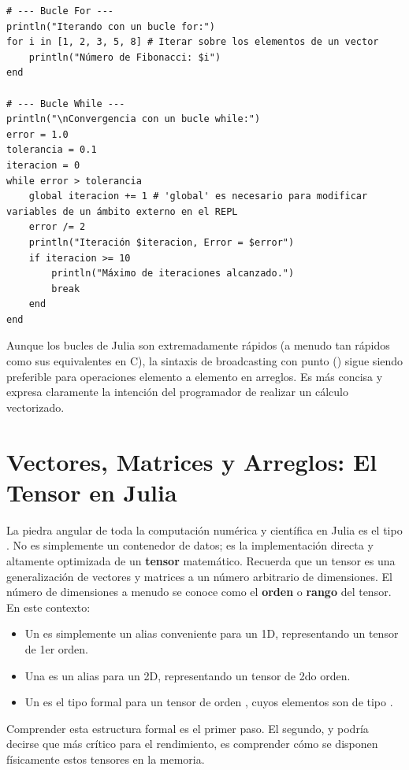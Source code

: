 \begin{example}
\text{ }\begin{verbatim}
# --- Bucle For ---
println("Iterando con un bucle for:")
for i in [1, 2, 3, 5, 8] # Iterar sobre los elementos de un vector
    println("Número de Fibonacci: $i")
end

# --- Bucle While ---
println("\nConvergencia con un bucle while:")
error = 1.0
tolerancia = 0.1
iteracion = 0
while error > tolerancia
    global iteracion += 1 # 'global' es necesario para modificar variables de un ámbito externo en el REPL
    error /= 2
    println("Iteración $iteracion, Error = $error")
    if iteracion >= 10
        println("Máximo de iteraciones alcanzado.")
        break
    end
end
\end{verbatim}
\end{example}
\begin{remark}
Aunque los bucles de Julia son extremadamente rápidos (a menudo tan rápidos como sus equivalentes en C), la sintaxis de broadcasting con punto () sigue siendo preferible para operaciones elemento a elemento en arreglos. Es más concisa y expresa claramente la intención del programador de realizar un cálculo vectorizado.
\end{remark}

\section{Vectores, Matrices y Arreglos: El Tensor en Julia}
\label{sec:julia_arrays}
La piedra angular de toda la computación numérica y científica en Julia es el tipo \textbf{}. No es simplemente un contenedor de datos; es la implementación directa y altamente optimizada de un \textbf{tensor} matemático. Recuerda que un tensor es una generalización de vectores y matrices a un número arbitrario de dimensiones. El número de dimensiones a menudo se conoce como el \textbf{orden} o \textbf{rango} del tensor. En este contexto:
\begin{itemize}
    \item Un \textbf{} es simplemente un alias conveniente para un  1D, representando un tensor de 1er orden.
    \item Una \textbf{} es un alias para un  2D, representando un tensor de 2do orden.
    \item Un  es el tipo formal para un tensor de orden , cuyos elementos son de tipo .
\end{itemize}
Comprender esta estructura formal es el primer paso. El segundo, y podría decirse que más crítico para el rendimiento, es comprender cómo se disponen físicamente estos tensores en la memoria.

